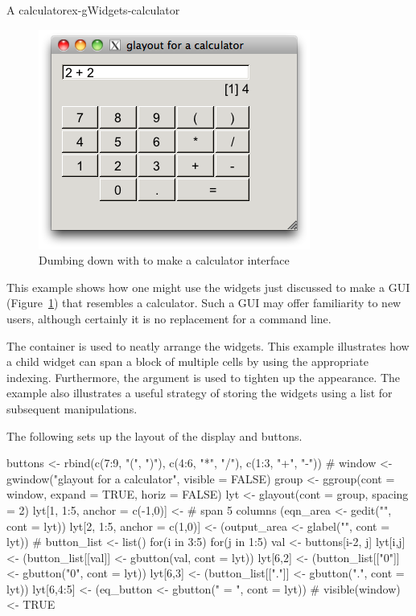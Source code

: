 \begin{example}{A calculator}{ex-gWidgets-calculator}

\begin{figure}
  \centering
  \includegraphics[width=.6\textwidth]{fig-gWidgets-calculuator.png}
  \caption{Dumbing down \R{} with  to make a calculator interface}
  \label{fig:gwidgets-calculator}
\end{figure}

This example shows how one might use the widgets just discussed to
make a GUI (Figure~\ref{fig:gwidgets-calculator}) that resembles a
calculator. Such a GUI may offer familiarity to new \R\/ users,
although certainly it is no replacement for a command line.

The  container is used to neatly arrange the
widgets. This example illustrates how a child widget can span a block
of multiple cells by using the appropriate indexing. Furthermore, the
 argument is used to tighten up the appearance. The
example also illustrates a useful strategy of storing the widgets
using a list for subsequent manipulations.

The following sets up the layout of the display and buttons.
\begin{Schunk}
\begin{Sinput}
 buttons <- rbind(c(7:9, "(", ")"),
                  c(4:6, "*", "/"),
                  c(1:3, "+", "-"))
 #
 window <- gwindow("glayout for a calculator", visible = FALSE)
 group <- ggroup(cont = window, expand = TRUE, horiz = FALSE)
 lyt <- glayout(cont = group, spacing = 2)
 lyt[1, 1:5, anchor = c(-1,0)] <-          # span 5 columns
   (eqn_area <- gedit("", cont = lyt))
 lyt[2, 1:5, anchor = c(1,0)] <- 
   (output_area <- glabel("", cont = lyt))
 #
 button_list <- list()
 for(i in 3:5) {
   for(j in 1:5) {
     val <- buttons[i-2, j]
     lyt[i,j] <- (button_list[[val]] <- gbutton(val, cont = lyt))
   }
 }
 lyt[6,2] <- (button_list[["0"]] <- gbutton("0", cont = lyt))
 lyt[6,3] <- (button_list[["."]] <- gbutton(".", cont = lyt))
 lyt[6,4:5] <- (eq_button <- gbutton(" = ", cont = lyt))
 #
 visible(window) <- TRUE
\end{Sinput}
\end{Schunk}


\end{example}
